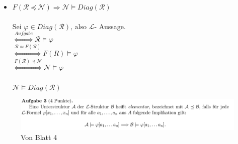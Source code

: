\documentclass[a4paper]{scrartcl}
\begin{document}
\begin{itemize}
\begin{itemize}
                \item $F(\mathcal{R} \preceq \mathcal{N}) \Rightarrow \mathcal{N} \vDash Diag(\mathcal{R})$\\
                    \\Sei $\varphi \in Diag(\mathcal{R}) \text{, also } \mathscr{L}$- Aussage.\\
                    $\overset{Aufgabe}{\Leftrightarrow} \mathcal{R} \vDash \varphi$\\
                    $\overset{\mathcal{R} \simeq F(\mathcal{R})}{\Leftrightarrow} F(R) \vDash \varphi$\\
                    $\overset{F(\mathcal{R}) \preceq \mathcal{N}}{\Leftrightarrow}\mathcal{N} \vDash \varphi$\\
                    \\$\mathcal{N} \vDash Diag(\mathcal{R})$\\


            \end{itemize}

            \begin{figure}[H]
                \centering
                \includegraphics[scale=0.3]{./B4-3.png}
                \caption{Von Blatt 4}
                \label{fig:./B4-3}
            \end{figure}
            


    \end{itemize}

\end{document}
